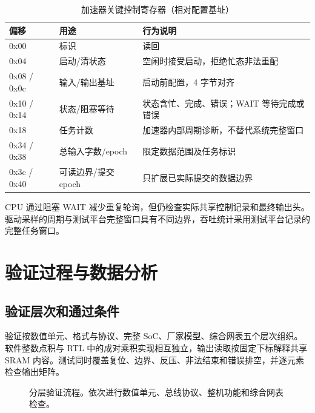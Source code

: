 \documentclass[UTF8,punct,fontset=none,zihao=-4]{ctexart}
\newcommand{\code}[1]{\texttt{\detokenize{#1}}}
\begin{document}
\begin{table}[H]\centering\small
\caption{加速器关键控制寄存器（相对配置基址）}
\begin{tabularx}{\linewidth}{p{19mm}p{31mm}Y}\toprule
偏移 & 用途 & 行为说明\\\midrule
0x00 & 标识 & 读回 \code{0x51313231}\\
0x04 & 启动/清状态 & 空闲时接受启动，拒绝忙态非法重配\\
0x08 / 0x0c & 输入/输出基址 & 启动前配置，4 字节对齐\\
0x10 / 0x14 & 状态/阻塞等待 & 状态含忙、完成、错误；WAIT 等待完成或错误\\
0x18 & 任务计数 & 加速器内部周期诊断，不替代系统完整窗口\\
0x34 / 0x38 & 总输入字数/epoch & 限定数据范围及任务标识\\
0x3c / 0x40 & 可读边界/提交 epoch & 只扩展已实际提交的数据边界\\
\bottomrule\end{tabularx}
\end{table}

CPU 通过阻塞 WAIT 减少重复轮询，但仍检查实际共享控制记录和最终输出头。驱动采样的周期与测试平台完整窗口具有不同边界，吞吐统计采用测试平台记录的完整任务窗口。



\section{验证过程与数据分析}
\subsection{验证层次和通过条件}
验证按数值单元、格式与协议、完整 SoC、厂家模型、综合网表五个层次组织。软件整数点积与 RTL 中的成对乘积实现相互独立，输出读取按固定下标解释共享 SRAM 内容。测试同时覆盖复位、边界、反压、非法结束和错误排空，并逐元素检查输出矩阵。

\begin{figure}[H]\centering
{}
\caption{分层验证流程。依次进行数值单元、总线协议、整机功能和综合网表检查。}
\end{figure}
\end{document}
